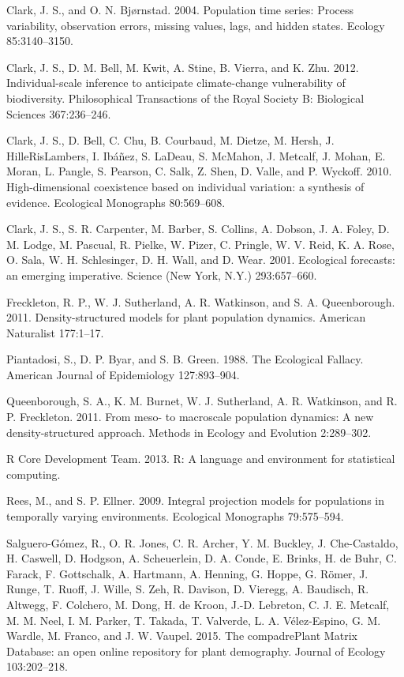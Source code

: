 \documentclass[12pt,]{article}
\begin{document}
Clark, J. S., and O. N. Bjørnstad. 2004. Population time series: Process
variability, observation errors, missing values, lags, and hidden
states. Ecology 85:3140--3150.

Clark, J. S., D. M. Bell, M. Kwit, A. Stine, B. Vierra, and K. Zhu.
2012. Individual-scale inference to anticipate climate-change
vulnerability of biodiversity. Philosophical Transactions of the Royal
Society B: Biological Sciences 367:236--246.

Clark, J. S., D. Bell, C. Chu, B. Courbaud, M. Dietze, M. Hersh, J.
HilleRisLambers, I. Ibáñez, S. LaDeau, S. McMahon, J. Metcalf, J. Mohan,
E. Moran, L. Pangle, S. Pearson, C. Salk, Z. Shen, D. Valle, and P.
Wyckoff. 2010. High-dimensional coexistence based on individual
variation: a synthesis of evidence. Ecological Monographs 80:569--608.

Clark, J. S., S. R. Carpenter, M. Barber, S. Collins, A. Dobson, J. A.
Foley, D. M. Lodge, M. Pascual, R. Pielke, W. Pizer, C. Pringle, W. V.
Reid, K. A. Rose, O. Sala, W. H. Schlesinger, D. H. Wall, and D. Wear.
2001. Ecological forecasts: an emerging imperative. Science (New York,
N.Y.) 293:657--660.

Freckleton, R. P., W. J. Sutherland, A. R. Watkinson, and S. A.
Queenborough. 2011. Density-structured models for plant population
dynamics. American Naturalist 177:1--17.

Piantadosi, S., D. P. Byar, and S. B. Green. 1988. The Ecological
Fallacy. American Journal of Epidemiology 127:893--904.

Queenborough, S. A., K. M. Burnet, W. J. Sutherland, A. R. Watkinson,
and R. P. Freckleton. 2011. From meso- to macroscale population
dynamics: A new density-structured approach. Methods in Ecology and
Evolution 2:289--302.

R Core Development Team. 2013. R: A language and environment for
statistical computing.

Rees, M., and S. P. Ellner. 2009. Integral projection models for
populations in temporally varying environments. Ecological Monographs
79:575--594.

Salguero-Gómez, R., O. R. Jones, C. R. Archer, Y. M. Buckley, J.
Che-Castaldo, H. Caswell, D. Hodgson, A. Scheuerlein, D. A. Conde, E.
Brinks, H. de Buhr, C. Farack, F. Gottschalk, A. Hartmann, A. Henning,
G. Hoppe, G. Römer, J. Runge, T. Ruoff, J. Wille, S. Zeh, R. Davison, D.
Vieregg, A. Baudisch, R. Altwegg, F. Colchero, M. Dong, H. de Kroon,
J.-D. Lebreton, C. J. E. Metcalf, M. M. Neel, I. M. Parker, T. Takada,
T. Valverde, L. A. Vélez-Espino, G. M. Wardle, M. Franco, and J. W.
Vaupel. 2015. The compadrePlant Matrix Database: an open online
repository for plant demography. Journal of Ecology 103:202--218.
\end{document}

